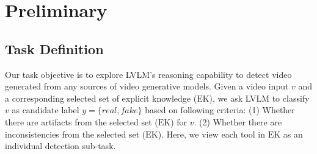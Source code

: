 \section{Preliminary}
\label{preliminary}
\subsection{Task Definition}
Our task objective is to explore LVLM's reasoning capability to detect video generated from any sources of video generative models. Given a video input $v$ and a corresponding selected set of explicit knowledge ($\text{EK}$), we ask LVLM to classify $v$ as candidate label $y=\{\textit{real}, \textit{fake}\}$ based on following criteria: (1) Whether there are artifacts from the selected set ($\text{EK}$) for $v$. (2) Whether there are inconsistencies from the selected set ($\text{EK}$).  Here, we view each tool in $\text{EK}$ as an individual detection sub-task. 

